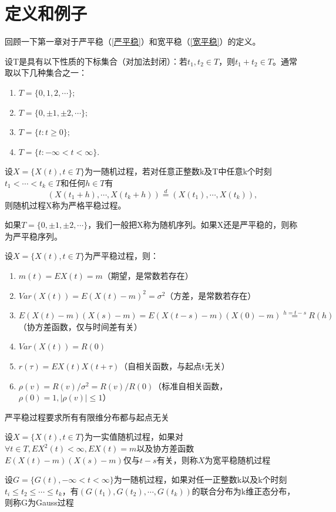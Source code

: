 \documentclass[]{report}
\begin{document}
	\section{定义和例子}
		回顾一下第一章对于严平稳（\ref{严平稳}）和宽平稳（\ref{宽平稳}）的定义。\par
		设T是具有以下性质的下标集合（对加法封闭）：若$t_1,t_2\in T$，则$t_1+t_2\in T$。通常取以下几种集合之一：
		\begin{enumerate}[label = (\roman{*})]
			\item $T=\{0,1,2,\cdots\};$
			\item $T=\{0,\pm1,\pm2,\cdots\};$
			\item $T=\{t:t\ge0\};$
			\item $T=\{t:-\infty<t<\infty\}.$
		\end{enumerate}
		\begin{definition}[严平稳过程]
			设$X=\{X(t),t\in T\}$为一随机过程，若对任意正整数k及T中任意k个时刻$t_1<\cdots<t_k\in T$和任何$h\in T$有
			\[(X(t_1+h),\cdots,X(t_k+h))\stackrel{d}{=}(X(t_1),\cdots,X(t_k)),\]则随机过程X称为严格平稳过程。
		\end{definition}\par
		如果$T=\{0,\pm1,\pm2,\cdots\}$，我们一般把X称为随机序列。如果X还是严平稳的，则称为严平稳序列。
		\begin{theorem}
			设$X=\{X(t),t\in T\}$为严平稳过程，则：
			\begin{enumerate}[label = (\alph{*})]
				\item $m(t)=EX(t)=m$（期望，是常数若存在）
				\item $Var(X(t))=E(X(t)-m)^2=\sigma^2$（方差，是常数若存在）
				\item $E(X(t)-m)(X(s)-m)=E(X(t-s)-m)(X(0)-m)\stackrel{h=t-s}{=}R(h)$（协方差函数，仅与时间差有关）
				\item $Var(X(t))=R(0)$
				\item $r(\tau)=EX(t)X(t+\tau)$（自相关函数，与起点t无关）
				\item $\rho(v)=R(v)/\sigma^2=R(v)/R(0)$（标准自相关函数，$\rho(0)=1,\mid\rho(v)\mid\le1$）
			\end{enumerate}
			严平稳过程要求所有有限维分布都与起点无关
		\end{theorem}
		\begin{definition}[宽平稳过程]
			设$X=\{X(t),t\in T\}$为一实值随机过程，如果对$\forall t\in T,EX^2(t)<\infty,EX(t)=m$以及协方差函数$E(X(t)-m)(X(s)-m)$仅与$t-s$有关，则称$X$为宽平稳随机过程
		\end{definition}
		\begin{definition}[Gauss过程]
			设$G=\{G(t),-\infty<t<\infty\}$为一随机过程，如果对任一正整数k以及k个时刻$t_i\le t_2\le\cdots\le t_k$，有$(G(t_1),G(t_2),\cdots,G(t_k))$的联合分布为k维正态分布，则称G为Gauss过程
		\end{definition}
\end{document}
